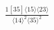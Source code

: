 \documentclass[varwidth, border=5pt]{standalone}
\begin{document}
\begin{my}
$\begin{gathered}
\scriptscriptstyle\frac{1[35]⟨15⟩⟨23⟩}{⟨14⟩^2⟨35⟩^2}
\end{gathered}$
\end{my}
\end{document}
